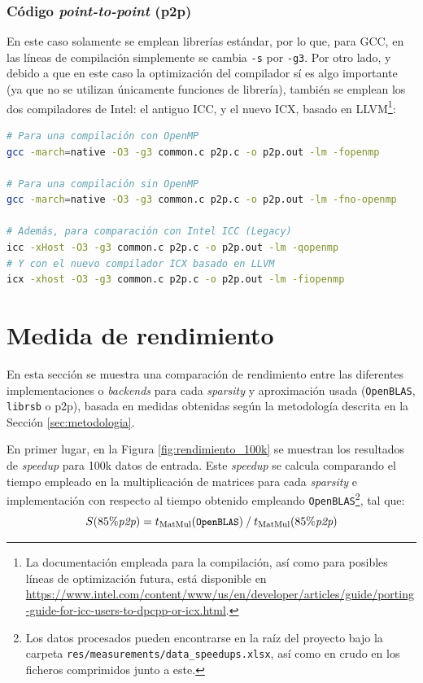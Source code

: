 \subsubsection{Código \textit{point-to-point} (p2p)}
En este caso solamente se emplean librerías estándar, por lo que, para GCC, en las líneas de compilación simplemente se cambia \texttt{-s} por \texttt{-g3}. Por otro lado, y debido a que en este caso la optimización del compilador sí es algo importante (ya que no se utilizan únicamente funciones de librería), también se emplean los dos compiladores de Intel: el antiguo ICC, y el nuevo ICX, basado en LLVM\footnote{La documentación empleada para la compilación, así como para posibles líneas de optimización futura, está disponible en \url{https://www.intel.com/content/www/us/en/developer/articles/guide/porting-guide-for-icc-users-to-dpcpp-or-icx.html}.}:\medskip
\begin{lstlisting}[language=bash]
# Para una compilación con OpenMP
gcc -march=native -O3 -g3 common.c p2p.c -o p2p.out -lm -fopenmp

# Para una compilación sin OpenMP
gcc -march=native -O3 -g3 common.c p2p.c -o p2p.out -lm -fno-openmp

# Además, para comparación con Intel ICC (Legacy)
icc -xHost -O3 -g3 common.c p2p.c -o p2p.out -lm -qopenmp
# Y con el nuevo compilador ICX basado en LLVM
icx -xhost -O3 -g3 common.c p2p.c -o p2p.out -lm -fiopenmp
\end{lstlisting}

\section{Medida de rendimiento}
\label{sec:medida_rendimiento}
En esta sección se muestra una comparación de rendimiento entre las diferentes implementaciones o \textit{backends} para cada \textit{sparsity} y aproximación usada (\texttt{OpenBLAS}, \texttt{librsb} o p2p), basada en medidas obtenidas según la metodología descrita en la Sección \ref{sec:metodologia}.

En primer lugar, en la Figura \ref{fig:rendimiento_100k} se muestran los resultados de \textit{speedup} para 100k datos de entrada. Este \textit{speedup} se calcula comparando el tiempo empleado en la multiplicación de matrices para cada \textit{sparsity} e implementación con respecto al tiempo obtenido empleando \texttt{OpenBLAS}\footnote{Los datos procesados pueden encontrarse en la raíz del proyecto bajo la carpeta \texttt{res/measurements/data\_speedups.xlsx}, así como en crudo en los ficheros comprimidos junto a este.}, tal que:
\begin{equation}
    S(85\%\textit{p2p}) = t_{\text{MatMul}}(\texttt{\small OpenBLAS})\: /\: t_{\text{MatMul}}(85\%\textit{p2p})\nonumber
    \label{eq:speedup_example}
\end{equation}

